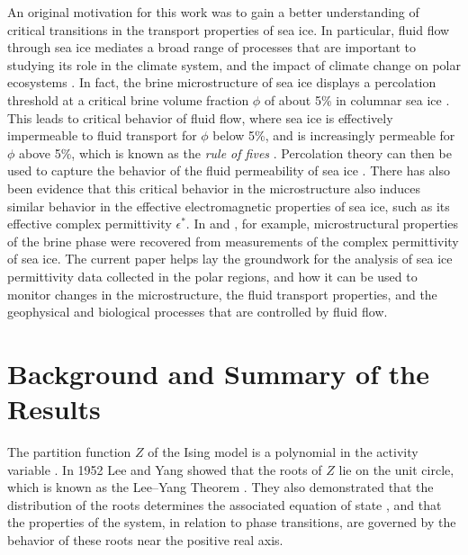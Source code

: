 \documentclass[english,12pt,jmp,graphicx]{revtex4-1}
\begin{document}
An original motivation for this work was to gain a better
understanding of critical transitions in the transport properties of
sea ice. In particular, fluid flow through sea ice mediates a broad
range of processes that are important to studying its role in the
climate system, and the impact of climate change on polar ecosystems
\cite{Golden:NAMS:2009}. In fact, the brine microstructure of sea ice
displays a percolation threshold at a critical brine volume fraction
$\phi$ of about 5\% in columnar sea ice
\cite{Golden:S-2238,Golden:2007:GRL,Pringle:JGR:2009}. 
This leads to critical behavior of fluid flow, where sea ice is effectively
impermeable to fluid transport for $\phi$
below 5\%, and is increasingly permeable for $\phi$ above 5\%, which is
known as the {\it rule of fives} \cite{Golden:S-2238}.
Percolation theory can then be used to capture the behavior of
the fluid permeability of sea ice \cite{Golden:2007:GRL}.
There has also been evidence \cite{Gully:PhysB:357,Orum:PRSLA:2012}
that this critical behavior in the
microstructure also induces similar behavior in the effective electromagnetic
properties of sea ice, such as its effective complex permittivity $\epsilon^*$.
In \cite{Gully:PhysB:357} and \cite{Orum:PRSLA:2012}, for example,
microstructural properties of the brine phase were recovered from
measurements of the complex permittivity of sea ice.
The current paper helps lay the groundwork for the analysis of
sea ice permittivity data collected in the polar regions, and how it can
be used to monitor changes in the microstructure, the fluid transport properties,
and the geophysical and biological processes that are controlled by
fluid flow.



\section{Background and Summary of the Results}\label{sec:Background}
%
The partition function $Z$ of the Ising model is a polynomial
in the activity variable \cite{Lee:PR:411,Baker-1990,Ruelle-1969,Ruelle:AM:589}.
In 1952 Lee and Yang \cite{Lee:PR:411} showed that the 
roots of $Z$ lie on the unit circle, which is
known as the Lee--Yang Theorem \cite{Lee:PR:411,Ruelle-1969}.
They also demonstrated that 
the distribution of the roots determines 
the associated equation of state
\cite{Yang:PR:404}, and that the properties of 
the system, in relation to phase transitions, are governed by the
behavior of these roots near the positive real axis.   
\end{document}
